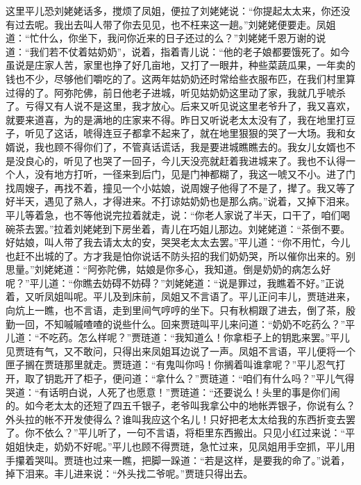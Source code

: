 \begin{parag}
    这里平儿恐刘姥姥话多，搅烦了凤姐，便拉了刘姥姥说：“你提起太太来，你还没有过去呢。我出去叫人带了你去见见，也不枉来这一趟。”刘姥姥便要走。凤姐道：“忙什么，你坐下，我问你近来的日子还过的么？”刘姥姥千恩万谢的说道：“我们若不仗着姑奶奶”，说着，指着青儿说：“他的老子娘都要饿死了。如今虽说是庄家人苦，家里也挣了好几亩地，又打了一眼井，种些菜蔬瓜果，一年卖的钱也不少，尽够他们嚼吃的了。这两年姑奶奶还时常给些衣服布匹，在我们村里算过得的了。阿弥陀佛，前日他老子进城，听见姑奶奶这里动了家，我就几乎唬杀了。亏得又有人说不是这里，我才放心。后来又听见说这里老爷升了，我又喜欢，就要来道喜，为的是满地的庄家来不得。昨日又听说老太太没有了，我在地里打豆子，听见了这话，唬得连豆子都拿不起来了，就在地里狠狠的哭了一大场。我和女婿说，我也顾不得你们了，不管真话谎话，我是要进城瞧瞧去的。我女儿女婿也不是没良心的，听见了也哭了一回子，今儿天没亮就赶着我进城来了。我也不认得一个人，没有地方打听，一径来到后门，见是门神都糊了，我这一唬又不小。进了门找周嫂子，再找不着，撞见一个小姑娘，说周嫂子他得了不是了，撵了。我又等了好半天，遇见了熟人，才得进来。不打谅姑奶奶也是那么病。”说着，又掉下泪来。平儿等着急，也不等他说完拉着就走，说：“你老人家说了半天，口干了，咱们喝碗茶去罢。”拉着刘姥姥到下房坐着，青儿在巧姐儿那边。刘姥姥道：“茶倒不要。好姑娘，叫人带了我去请太太的安，哭哭老太太去罢。”平儿道：“你不用忙，今儿也赶不出城的了。方才我是怕你说话不防头招的我们奶奶哭，所以催你出来的。别思量。”刘姥姥道：“阿弥陀佛，姑娘是你多心，我知道。倒是奶奶的病怎么好呢？”平儿道：“你瞧去妨碍不妨碍？”刘姥姥道：“说是罪过，我瞧着不好。”正说着，又听凤姐叫呢。平儿及到床前，凤姐又不言语了。平儿正问丰儿，贾琏进来，向炕上一瞧，也不言语，走到里间气哼哼的坐下。只有秋桐跟了进去，倒了茶，殷勤一回，不知嘁嘁喳喳的说些什么。回来贾琏叫平儿来问道：“奶奶不吃药么？”平儿道：“不吃药。怎么样呢？”贾琏道：“我知道么！你拿柜子上的钥匙来罢。”平儿见贾琏有气，又不敢问，只得出来凤姐耳边说了一声。凤姐不言语，平儿便将一个匣子搁在贾琏那里就走。贾琏道：“有鬼叫你吗！你搁着叫谁拿呢？”平儿忍气打开，取了钥匙开了柜子，便问道：“拿什么？”贾琏道：“咱们有什么吗？”平儿气得哭道：“有话明白说，人死了也愿意！”贾琏道：“还要说么！头里的事是你们闹的。如今老太太的还短了四五千银子，老爷叫我拿公中的地帐弄银子，你说有么？外头拉的帐不开发使得么？谁叫我应这个名儿！只好把老太太给我的东西折变去罢了。你不依么？”平儿听了，一句不言语，将柜里东西搬出。只见小红过来说：“平姐姐快走，奶奶不好呢。”平儿也顾不得贾琏，急忙过来，见凤姐用手空抓，平儿用手攥着哭叫。贾琏也过来一瞧，把脚一跺道：“若是这样，是要我的命了。”说着，掉下泪来。丰儿进来说：“外头找二爷呢。”贾琏只得出去。
\end{parag}


